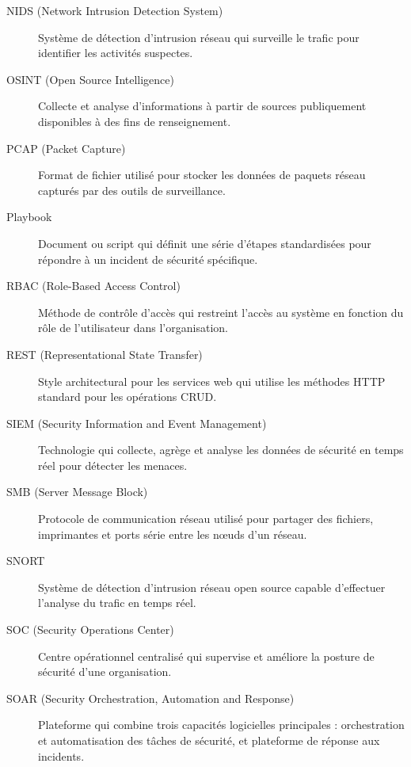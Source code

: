 \begin{description}
    \item[NIDS (Network Intrusion Detection System)]
          Système de détection d'intrusion réseau qui surveille le trafic pour identifier les activités suspectes.

    \item[OSINT (Open Source Intelligence)]
          Collecte et analyse d'informations à partir de sources publiquement disponibles à des fins de renseignement.

    \item[PCAP (Packet Capture)]
          Format de fichier utilisé pour stocker les données de paquets réseau capturés par des outils de surveillance.

    \item[Playbook]
          Document ou script qui définit une série d'étapes standardisées pour répondre à un incident de sécurité spécifique.

    \item[RBAC (Role-Based Access Control)]
          Méthode de contrôle d'accès qui restreint l'accès au système en fonction du rôle de l'utilisateur dans l'organisation.

    \item[REST (Representational State Transfer)]
          Style architectural pour les services web qui utilise les méthodes HTTP standard pour les opérations CRUD.

    \item[SIEM (Security Information and Event Management)]
          Technologie qui collecte, agrège et analyse les données de sécurité en temps réel pour détecter les menaces.

    \item[SMB (Server Message Block)]
          Protocole de communication réseau utilisé pour partager des fichiers, imprimantes et ports série entre les nœuds d'un réseau.

    \item[SNORT]
          Système de détection d'intrusion réseau open source capable d'effectuer l'analyse du trafic en temps réel.

    \item[SOC (Security Operations Center)]
          Centre opérationnel centralisé qui supervise et améliore la posture de sécurité d'une organisation.

    \item[SOAR (Security Orchestration, Automation and Response)]
          Plateforme qui combine trois capacités logicielles principales : orchestration et automatisation des tâches de sécurité, et plateforme de réponse aux incidents.


\end{description}
